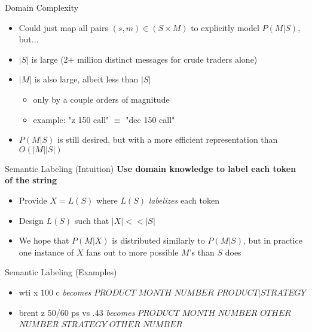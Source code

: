 \begin{frame}{Domain Complexity}
\begin{itemize}
\item Could just map all pairs $(s,m) \in (S \times M)$ to explicitly model $P(M|S)$, but...
\pause
\item $|S|$ is large (2+ million distinct messages for crude traders alone) 
\pause
\item $|M|$ is also large, albeit less than $|S|$ 
\begin{itemize}
\item only by a couple orders of magnitude  
\item example: "z 150 call" $\equiv$ "dec 150 call"\newline
\end{itemize}
\pause
\item $P(M|S)$ is still desired, but with a more efficient representation than $O(|M||S|)$
\end{itemize}
\end{frame}

\begin{frame}{Semantic Labeling (Intuition)}
\textbf{Use domain knowledge to label each token of the string}\newline
\begin{itemize}
\pause
\item Provide $X = L(S)$ where $L(S)$ \textit{labelizes} each token
\item Design $L(S)$ such that $|X| << |S|$\newline
\pause
\item We hope that $P(M|X)$ is distributed similarly to $P(M|S)$, but in practice one instance of $X$ fans out to more possible $M$'s than $S$ does
\end{itemize}
\end{frame}


\begin{frame}{Semantic Labeling (Examples)}
\begin{itemize}
\item wti x 100 c \newline\newline \textit{becomes} \newline
\newline$PRODUCT$ $MONTH$ $NUMBER$ $PRODUCT|STRATEGY$\newline
\pause
\item brent z 50/60 ps vs .43 \newline\newline \textit{becomes} \newline
\newline$PRODUCT$ $MONTH$ $NUMBER$ $OTHER$ $NUMBER$ $STRATEGY$ $OTHER$ $NUMBER$
\end{itemize}
\end{frame}

